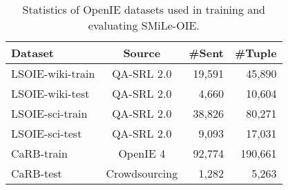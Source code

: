 \documentclass[11pt]{article}
\newcommand{\mname}{SMiLe-OIE\xspace}
\begin{document}
\begin{table}[t]
\small
\centering
\begin{tabular}{ l|crr}
 \toprule
 Dataset & Source & \#Sent & \#Tuple\\
 \midrule
 LSOIE-wiki-train & QA-SRL 2.0 & 19,591 & 45,890 \\
 LSOIE-wiki-test & QA-SRL 2.0 & 4,660 & 10,604 \\
 \midrule
 LSOIE-sci-train & QA-SRL 2.0 & 38,826 & 80,271 \\
 LSOIE-sci-test & QA-SRL 2.0 & 9,093 & 17,031 \\
  \midrule
 CaRB-train & OpenIE 4 & 92,774 & 190,661 \\
 CaRB-test & Crowdsourcing & 1,282 & 5,263 \\
 \bottomrule
\end{tabular}
\vspace{-0.5em}
\caption{Statistics of OpenIE datasets used in training and evaluating \mname.}
\vspace{0.5em}
\label{tab:data_set}
\end{table}
\end{document}
